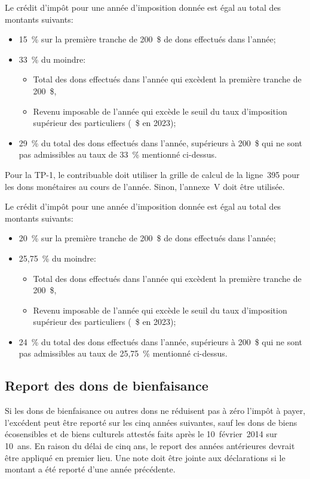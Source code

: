 Le crédit d'impôt pour une année d'imposition donnée est égal au total des montants suivants:
\begin{itemize}
	\item 15~\% sur la première tranche de 200~\$ de dons effectués dans l'année;
	\item 33~\% du moindre:
	\begin{itemize}
		\item Total des dons effectués dans l'année qui excèdent la première tranche de 200~\$,
		\item Revenu imposable de l'année qui excède le seuil du taux d'imposition supérieur des particuliers (~\$ en 2023);
	\end{itemize}
	\item 29~\% du total des dons effectués dans l'année, supérieurs à 200~\$ qui ne sont pas admissibles au taux de 33~\% mentionné ci-dessus.
\end{itemize}

Pour la TP-1, le contribuable doit utiliser la grille de calcul de la ligne~395 pour les dons monétaires au cours de l'année. Sinon, l'annexe~V doit être utilisée.

Le crédit d'impôt pour une année d'imposition donnée est égal au total des montants suivants:
\begin{itemize}
	\item 20~\% sur la première tranche de 200~\$ de dons effectués dans l'année;
	\item 25,75~\% du moindre:
	\begin{itemize}
		\item Total des dons effectués dans l'année qui excèdent la première tranche de 200~\$,
		\item Revenu imposable de l'année qui excède le seuil du taux d'imposition supérieur des particuliers (~\$ en 2023);
	\end{itemize}
	\item 24~\% du total des dons effectués dans l'année, supérieurs à 200~\$ qui ne sont pas admissibles au taux de 25,75~\% mentionné ci-dessus.
\end{itemize}


\subsection{Report des dons de bienfaisance}
Si les dons de bienfaisance ou autres dons ne réduisent pas à zéro l'impôt à payer, l'excédent peut être reporté sur les cinq années suivantes, sauf les dons de biens écosensibles et de biens culturels attestés faits après le 10~février~2014 sur 10~ans. En raison du délai de cinq ans, le report des années antérieures devrait être appliqué en premier lieu. Une note doit être jointe aux déclarations si le montant a été reporté d'une année précédente.


